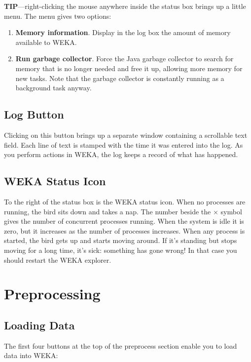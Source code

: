 \documentclass[a4paper]{article}
\begin{document}
\textbf{TIP}---right-clicking the mouse anywhere inside the status box brings
up a little menu. The menu gives two options: 

\begin{enumerate}
\item \textbf{Memory information}.
Display in the log box the amount of memory available to WEKA.
\item \textbf{Run garbage collector}.
Force the Java garbage collector to search for memory that is no longer needed
and free it up, allowing more memory for new tasks. Note that the garbage
collector is constantly running as a background task anyway.
\end{enumerate}

\subsection{Log Button}

Clicking on this button brings up a separate window containing a scrollable text
field. Each line of text is stamped with the time it was entered into the
log. As you perform actions in WEKA, the log keeps a record of what has
happened.

\subsection{WEKA Status Icon}

To the right of the status box is the WEKA status icon. When no processes are
running, the bird sits down and takes a nap. The number beside the $\times$
symbol gives the number of concurrent processes running.  When the system is
idle it is zero, but it increases as the number of processes increases.
When any process is started, the bird gets up and starts moving around. If
it's standing but stops moving for a long time, it's sick: something has gone
wrong!  In that case you should restart the WEKA explorer.

\section{Preprocessing}

\subsection{Loading Data}

The first four buttons at the top of the preprocess section enable
you to load data into WEKA:
\end{document}
